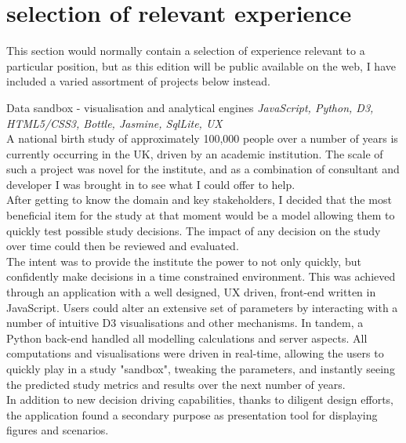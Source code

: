 \documentclass[]{friggeri-cv} %
\begin{document}

\newpage
\section{selection of relevant experience}
This section would normally contain a selection of experience relevant to a particular position, but as this edition will be public available on the web, I have included a varied assortment of projects below instead. 

\begin{projectentrylist}
\projectentry
{Data sandbox -  visualisation and analytical engines}
{\emph{JavaScript, Python, D3, HTML5/CSS3, Bottle, Jasmine, SqlLite, UX} \\
A national birth study of approximately 100,000 people over a number of years is currently occurring in the UK, driven by an academic institution. The scale of such a project was novel for the institute, and as a combination of consultant and developer I was brought in to see what I could offer to help.\\
After getting to know the domain and key stakeholders, I decided that the most beneficial item for the study at that moment would be a model allowing them to quickly test possible study decisions. The impact of any decision on the study over time could then be reviewed and evaluated.  \\
The intent was to provide the institute the power to not only quickly, but confidently make decisions in a time constrained environment. This was achieved through an application with a well designed, UX driven, front-end written in JavaScript. Users could  alter an extensive set of parameters by interacting with a number of intuitive D3 visualisations and other mechanisms. In tandem, a Python back-end handled all modelling calculations and server aspects. All computations and visualisations were driven in real-time, allowing the users to quickly play in a study "sandbox", tweaking the parameters, and instantly seeing the predicted study metrics and results over the next number of years. \\
In addition to new decision driving capabilities,  thanks to diligent design efforts, the application found a secondary purpose as presentation tool for displaying figures and scenarios.}


\end{projectentrylist}
\end{document}
